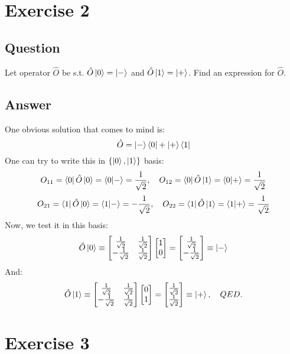 \documentclass{article}
\begin{document}
\section{Exercise 2}
\subsection{Question}
Let operator $\hat{O}$ be s.t. $\hat{O}\ket{0} = \ket{-}$ and $\hat{O}\ket{1} = \ket{+}$. Find an expression for $\hat{O}$.
\subsection{Answer}
One obvious solution that comes to mind is:
$$\hat{O} = \ket{-}\bra{0} + \ket{+}\bra{1}$$
One can try to write this in $\{ \ket{0}, \ket{1}\}$ basis:
$$O_{11} = \bra{0}\hat{O}\ket{0} = \braket{0}{-} = \frac{1}{\sqrt{2}} , \quad O_{12} = \bra{0}\hat{O}\ket{1} = \braket{0}{+} = \frac{1}{\sqrt{2}}$$
$$O_{21} = \bra{1}\hat{O}\ket{0} = \braket{1}{-} = -\frac{1}{\sqrt{2}} , \quad O_{22} = \bra{1}\hat{O}\ket{1} = \braket{1}{+} = \frac{1}{\sqrt{2}}$$
Now, we test it in this basis:
$$\hat{O}\ket{0} \equiv \begin{bmatrix}
    \frac{1}{\sqrt{2}} & \frac{1}{\sqrt{2}} \\
    -\frac{1}{\sqrt{2}} & \frac{1}{\sqrt{2}}
\end{bmatrix}\begin{bmatrix}
    1 \\ 0
\end{bmatrix} = \begin{bmatrix}
    \frac{1}{\sqrt{2}} \\ -\frac{1}{\sqrt{2}}
\end{bmatrix} \equiv \ket{
-
}$$
And:
$$\hat{O}\ket{1} \equiv \begin{bmatrix}
    \frac{1}{\sqrt{2}} & \frac{1}{\sqrt{2}} \\
    -\frac{1}{\sqrt{2}} & \frac{1}{\sqrt{2}}
\end{bmatrix}\begin{bmatrix}
    0 \\ 1
\end{bmatrix} = \begin{bmatrix}
    \frac{1}{\sqrt{2}} \\ \frac{1}{\sqrt{2}}
\end{bmatrix} \equiv \ket{
+
}, \quad QED.$$


\section{Exercise 3}
\end{document}
